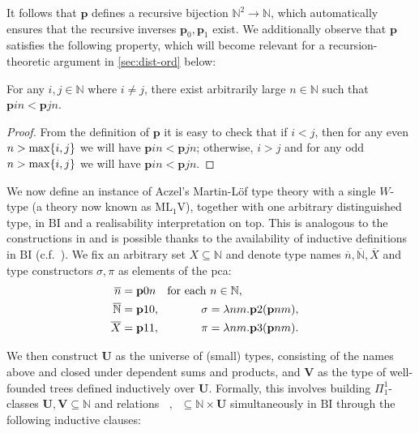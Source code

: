 \documentclass[preprint]{elsarticle}
\theoremstyle{plain}
\DeclareMathOperator{\din}{\dot{\in}}
\DeclareMathOperator{\dnin}{\dot{\not\in}}
\begin{document}
It follows that $\mathbf{p}$ defines a recursive bijection $\mathbb{N}^2 \rightarrow \mathbb{N}$, which automatically ensures that the recursive inverses $\mathbf{p}_0, \mathbf{p}_1$ exist. We additionally observe that $\mathbf{p}$ satisfies the following property, which will become relevant for a recursion-theoretic argument in \autoref{sec:dist-ord} below:

\begin{lemma}
  \label{lem:pairing-property}
  For any $i, j \in \mathbb{N}$ where $i \neq j$, there exist arbitrarily large $n \in \mathbb{N}$ such that $\mathbf{p}in < \mathbf{p}jn$.
\end{lemma}

\begin{proof}
  From the definition of $\mathbf{p}$ it is easy to check that if $i < j$, then for any even $n > \mathrm{max}\mleft\{i, j\mright\}$ we will have $\mathbf{p}in < \mathbf{p}jn$; otherwise, $i > j$ and for any odd $n > \mathrm{max}\mleft\{i, j\mright\}$ we will have $\mathbf{p}in < \mathbf{p}jn$.
\end{proof}

We now define an instance of Aczel's Martin-L\"of type theory with a single $W$-type \cite{aczel78-type-theoretic-cst} (a theory now known as $\mathrm{ML}_1\mathrm{V}$), together with one arbitrary distinguished type, in $\mathrm{BI}$ and a realisability interpretation on top. This is analogous to the constructions in \cite[section 5--6]{rathjen14-czf-lpo} and is possible thanks to the availability of inductive definitions in $\mathrm{BI}$ (c.f.\ \cite[Lemma 3.2]{rathjen14-czf-lpo}). We fix an arbitrary set $X \subseteq \mathbb{N}$ and denote type names $\overline{n}, \overline{\mathbb{N}}, \overline{X}$ and type constructors $\sigma, \pi$ as elements of the pca:
\begin{alignat*}{2}
  \overline{n}          & = \mathbf{p}0n \quad \mathrlap{\text{for each $n \in \mathbb{N}$},}                                                                         \\
  \overline{\mathbb{N}} & = \mathbf{p}10,                                                     & \qquad \sigma & = \lambda nm. \mathbf{p}2\mleft(\mathbf{p}nm\mright), \\
  \overline{X}          & = \mathbf{p}11,                                                     & \pi           & = \lambda nm. \mathbf{p}3\mleft(\mathbf{p}nm\mright).
\end{alignat*}

We then construct $\mathbf{U}$ as the universe of (small) types, consisting of the names above and closed under dependent sums and products, and $\mathbf{V}$ as the type of well-founded trees defined inductively over $\mathbf{U}$. Formally, this involves building $\Pi^1_1$-classes $\mathbf{U}, \mathbf{V} \subseteq \mathbb{N}$ and relations ${\din}, {\dnin} \subseteq \mathbb{N} \times \mathbf{U}$ simultaneously in $\mathrm{BI}$ through the following inductive clauses:
\end{document}
